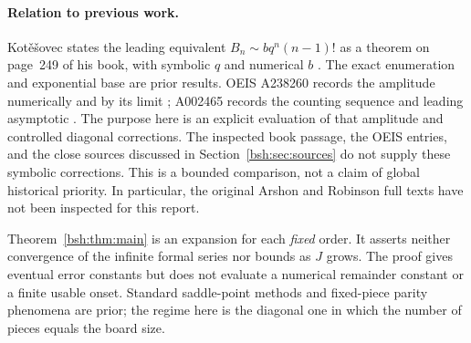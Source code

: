 \documentclass[11pt,letterpaper]{article}
\theoremstyle{remark}\newtheorem{remark}[theorem]{Remark}
\begin{document}
\paragraph{Relation to previous work.}
Kot\v e\v sovec states the leading equivalent $B_n\sim bq^n(n-1)!$ as a theorem on page~249 of his book, with symbolic $q$ and numerical $b$ \cite{kotesovec}. The exact enumeration and exponential base are prior results. OEIS A238260 records the amplitude numerically and by its limit \cite{oeisconstant}; A002465 records the counting sequence and leading asymptotic \cite{oeisbishops}. The purpose here is an explicit evaluation of that amplitude and controlled diagonal corrections. The inspected book passage, the OEIS entries, and the close sources discussed in Section~\ref{bsh:sec:sources} do not supply these symbolic corrections. This is a bounded comparison, not a claim of global historical priority. In particular, the original Arshon and Robinson full texts have not been inspected for this report.

Theorem~\ref{bsh:thm:main} is an expansion for each \emph{fixed} order. It asserts neither convergence of the infinite formal series nor bounds as $J$ grows. The proof gives eventual error constants but does not evaluate a numerical remainder constant or a finite usable onset. Standard saddle-point methods and fixed-piece parity phenomena are prior; the regime here is the diagonal one in which the number of pieces equals the board size.
\end{document}
